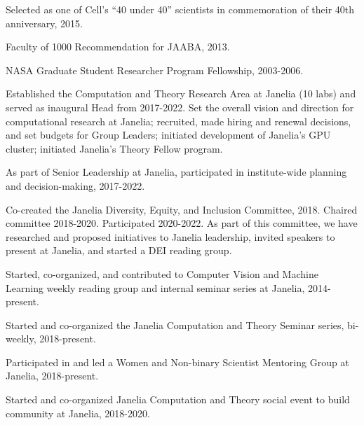 \documentclass[11pt, letterpaper]{awesome-cv}
\begin{document}
\vspace{\acvSectionContentTopSkip}
\vspace{2mm}
\begin{cvitems}
\item Selected as one of Cell’s ``40 under 40'' scientists in commemoration of their 40th anniversary, 2015.
\item Faculty of 1000 Recommendation for JAABA, 2013.
\item NASA Graduate Student Researcher Program Fellowship, 2003-2006.
\end{cvitems}
\vspace{\acvSectionContentTopSkip}

\vspace{\acvSectionContentTopSkip}
\vspace{2mm}
\begin{cvitems}
\item Established the Computation and Theory Research Area at Janelia (10 labs) and served as inaugural Head from 2017-2022. Set the overall vision and direction for computational research at Janelia; recruited, made hiring and renewal decisions, and set budgets for Group Leaders; initiated development of Janelia's GPU cluster; initiated Janelia's Theory Fellow program. 
\item As part of Senior Leadership at Janelia, participated in institute-wide planning and decision-making, 2017-2022.
\item Co-created the Janelia Diversity, Equity, and Inclusion Committee, 2018. Chaired committee 2018-2020. Participated 2020-2022. As part of this committee, we have researched and proposed initiatives to Janelia leadership, invited speakers to present at Janelia, and started a DEI reading group.
\item Started, co-organized, and contributed to Computer Vision and Machine Learning weekly reading group and internal seminar series at Janelia, 2014-present.
\item Started and co-organized the Janelia Computation and Theory Seminar series, bi-weekly, 2018-present. 
\item Participated in and led a Women and Non-binary Scientist Mentoring Group at Janelia, 2018-present.
\item Started and co-organized Janelia Computation and Theory social event to build community at Janelia, 2018-2020. 
\end{cvitems}
\vspace{\acvSectionContentTopSkip}
\end{document}
